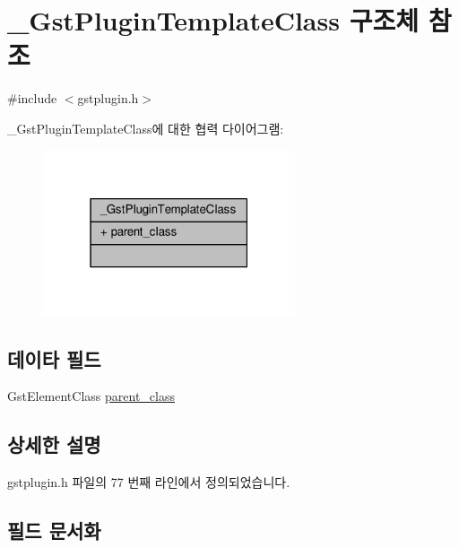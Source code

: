 \hypertarget{struct___gst_plugin_template_class}{}\section{\+\_\+\+Gst\+Plugin\+Template\+Class 구조체 참조}
\label{struct___gst_plugin_template_class}


{\ttfamily \#include $<$gstplugin.\+h$>$}



\+\_\+\+Gst\+Plugin\+Template\+Class에 대한 협력 다이어그램\+:
\nopagebreak
\begin{figure}[H]
\begin{center}
\leavevmode
\includegraphics[width=211pt]{struct___gst_plugin_template_class__coll__graph}
\end{center}
\end{figure}
\subsection*{데이타 필드}
\begin{DoxyCompactItemize}
\item 
Gst\+Element\+Class \hyperlink{struct___gst_plugin_template_class_aa90acadd5b3a6279a72c08fd7f6ce60a}{parent\+\_\+class}
\end{DoxyCompactItemize}


\subsection{상세한 설명}


gstplugin.\+h 파일의 77 번째 라인에서 정의되었습니다.



\subsection{필드 문서화}
